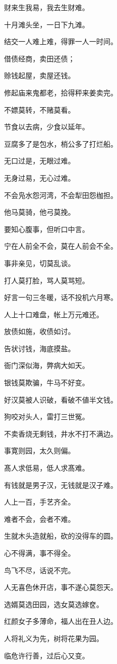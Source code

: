 \documentclass[12pt,oneside]{book}
\begin{document}
财来生我易，我去生财难。

十月滩头坐，一日下九滩。

结交一人难上难，得罪一人一时间。

借债经商，卖田还债；

赊钱起屋，卖屋还钱。

修起庙来鬼都老，拾得秤来姜卖完。

不嫖莫转，不赌莫看。

节食以去病，少食以延年。

豆腐多了是包水，梢公多了打烂船。

无口过是，无眼过难。

无身过易，无心过难。

不会凫水怨河湾，不会犁田怨枷担。

他马莫骑，他弓莫挽。

要知心腹事，但听口中言。

宁在人前全不会，莫在人前会不全。

事非亲见，切莫乱谈。

打人莫打脸，骂人莫骂短。

好言一句三冬暖，话不投机六月寒。

人上十口难盘，帐上万元难还。

放债如施，收债如讨。

告状讨钱，海底摸盐。

衙门深似海，弊病大如天。

银钱莫欺骗，牛马不好变。

好汉莫被人识破，看破不値半文钱。

狗咬对头人，雷打三世冤。

不卖香烧无剩钱，井水不打不满边。

事寛则园，太久则偏。

髙人求低易，低人求髙难。

有钱就是男子汉，无钱就是汉子难。

人上一百，手艺齐全。

难者不会，会者不难。

生就木头造就船，砍的没得车的圆。

心不得满，事不得全。

鸟飞不尽，话说不完。

人无喜色休开店，事不遂心莫怨天。

选婿莫选田园，选女莫选嫁奁。

红颜女子多薄命，福人出在丑人边。

人将礼义为先，树将花果为园。

临危许行善，过后心又变。
\end{document}
